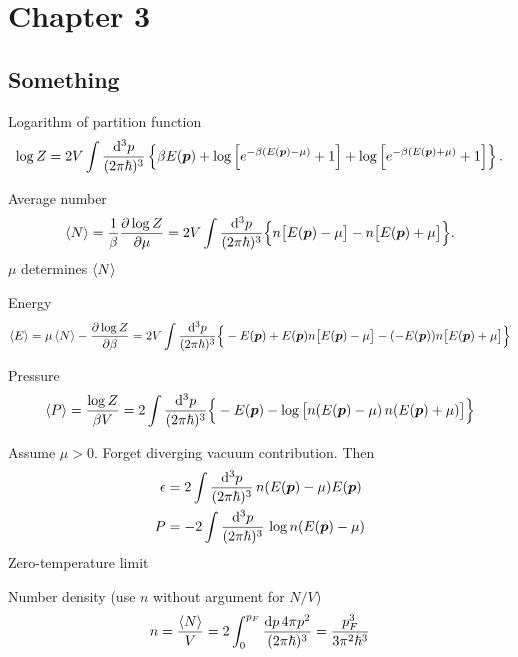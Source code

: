 \chapter{Chapter 3}

\section{Something}

Logarithm of partition function
\begin{equation}
	\log Z = 2 V \int \frac{\mathop{}\!\mathrm{d}^3 p}{(2 \pi \hbar)^3} \left\{ \beta E({\bm{p}}) + \log \left[ e^{-\beta (E({\bm{p}}) - \mu)}+1 \right] + \log \left[ e^{-\beta (E({\bm{p}}) + \mu)} + 1\right] \right\} .
\end{equation}

Average number
\begin{equation}
	\left< N \right> = 
	\frac{1}{\beta} \pdv{\log Z}{\mu} =
	2 V \int \frac{\mathop{}\!\mathrm{d}^3 p}{(2 \pi \hbar)^3} \Big\{ n\big[ E({\bm{p}})-\mu \big] - n\big[ E({\bm{p}})+\mu \big] \Big\} .
\end{equation}
$\mu$ determines $\left< N \right>$

Energy
\begin{equation}
	\left< E \right> = 
	\mu \left< N \right> - \pdv{\log Z}{\beta} =
	2 V \int \frac{\mathop{}\!\mathrm{d}^3 p}{(2 \pi \hbar)^3} \Big\{ -E({\bm{p}}) + E({\bm{p}}) n\big[ E({\bm{p}})-\mu \big] - (-E({\bm{p}})) n\big[ E({\bm{p}})+\mu \big] \Big\}
\end{equation}

Pressure
\begin{equation}
	\left< P \right> = 
	\frac{\log Z}{\beta V} = 
	2 \int \frac{\mathop{}\!\mathrm{d}^3 p}{(2 \pi \hbar)^3} \Big\{ -E({\bm{p}}) - \log \big[ n(E({\bm{p}})-\mu) \, n(E({\bm{p}})+\mu) \big] \Big\}
\end{equation}

Assume $\mu > 0$.
Forget diverging vacuum contribution.
Then
\begin{equation}
\begin{split}
	\epsilon &=  2 \int \frac{\mathop{}\!\mathrm{d}^3 p}{(2 \pi \hbar)^3} \, n(E({\bm{p}})-\mu) E({\bm{p}}) \\
	P        &= -2 \int \frac{\mathop{}\!\mathrm{d}^3 p}{(2 \pi \hbar)^3} \, \log n(E({\bm{p}})-\mu) \\
\end{split}
\end{equation}
Zero-temperature limit

Number density (use $n$ without argument for $N/V$)
\begin{equation}
	n = \frac{\left< N \right>}{V} = 2 \int_0^{p_F} \frac{\mathop{}\!\mathrm{d} p \, 4 \pi p^2}{(2 \pi \hbar)^3} = \frac{p_F^3}{3 \pi^2 \hbar^3}
\end{equation}

